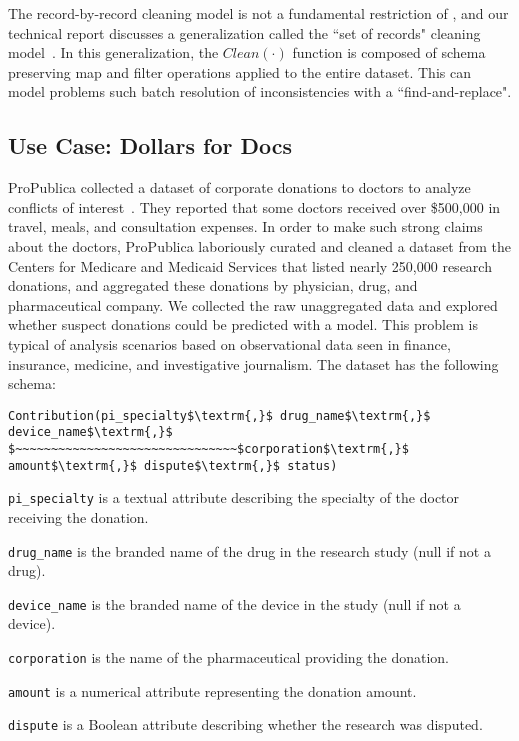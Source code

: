 The record-by-record cleaning model is not a fundamental restriction of \sys, and our technical report discusses a generalization called the ``set of records" cleaning model~\cite{activecleanarxiv}.
In this generalization, the $Clean(\cdot)$ function is composed of schema preserving \textsf{map} and \textsf{filter} operations applied to the entire dataset.
This can model problems such batch resolution of inconsistencies with a ``find-and-replace".

\subsection{Use Case: Dollars for Docs}\label{s:usecase}
ProPublica collected a dataset of corporate donations to doctors to analyze conflicts of interest~\cite{dollarsfordocsa}. 
They reported that some doctors received over \$500,000 in travel, meals, and consultation expenses.
In order to make such strong claims about the doctors, ProPublica laboriously curated and cleaned a dataset from the Centers for Medicare and Medicaid Services that listed nearly 250,000 research donations, and aggregated these donations by physician, drug, and pharmaceutical company.
We collected the raw unaggregated data and explored whether suspect donations could be predicted with a model.
This problem is typical of analysis scenarios based on observational data seen in finance, insurance, medicine, and investigative journalism.
The dataset has the following schema:
\begin{lstlisting}[mathescape,basicstyle={\small}]
Contribution(pi_specialty$\textrm{,}$ drug_name$\textrm{,}$ device_name$\textrm{,}$
$~~~~~~~~~~~~~~~~~~~~~~~~~~~~~~~$corporation$\textrm{,}$ amount$\textrm{,}$ dispute$\textrm{,}$ status)
\end{lstlisting}

\noindent\texttt{pi\_specialty} is a textual attribute describing the specialty of the doctor receiving the donation.

\noindent\texttt{drug\_name} is the branded name of the drug in the research study (null if not a drug).

\noindent\texttt{device\_name} is the branded name of the device in the study (null if not a device).

\noindent\texttt{corporation} is the name of the pharmaceutical providing the donation.

\noindent\texttt{amount} is a numerical attribute representing the donation amount.

\noindent\texttt{dispute} is a Boolean attribute describing whether the research was disputed.


